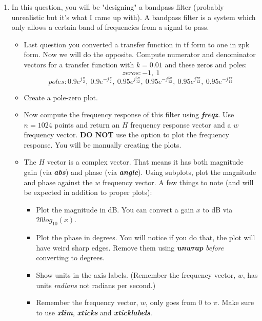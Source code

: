 \documentclass[12pt]{article}
\begin{document}
\begin{enumerate}
\begin{itemize}
	\end{itemize}
\item In this question, you will be "designing" a bandpass filter (probably unrealistic but it's what I came up with). A bandpass filter is a system which only allows a certain band of frequencies from a signal to pass.
\begin{itemize}
	\item Last question you converted a transfer function in tf form to one in zpk form. Now we will do the opposite. Compute numerator and denominator vectors for a transfer function with $k = 0.01$ and these zeros and poles:
	$$zeros: -1,\: 1$$
	$$poles: 0.9e^{j\frac{\pi}{2}},\: 0.9e^{-j\frac{\pi}{2}},\: 0.95e^{j\frac{5\pi}{12}},\: 0.95e^{-j\frac{5\pi}{12}},\: 0.95e^{j\frac{7\pi}{12}},\: 0.95e^{-j\frac{7\pi}{12}}$$
	\item Create a pole-zero plot.
	\item Now compute the frequency response of this filter using \textbf{\textit{freqz}}. Use $n = 1024$ points and return an $H$ frequency response vector and a $w$ frequency vector. \textbf{DO NOT} use the option to plot the frequency response. You will be manually creating the plots.
	\item The $H$ vector is a complex vector. That means it has both magnitude gain (via \textbf{\textit{abs}}) and phase (via \textbf{\textit{angle}}). Using subplots, plot the magnitude and phase against the $w$ frequency vector. A few things to note (and will be expected in addition to proper plots):
	\begin{itemize}
	\item Plot the magnitude in dB. You can convert a gain $x$ to dB via $20log_{10}(x)$.
	\item Plot the phase in degrees. You will notice if you do that, the plot will have weird sharp edges. Remove them using \textbf{\textit{unwrap}} \textit{before} converting to degrees.
	\item Show units in the axis labels. (Remember the frequency vector, $w$, has units \textit{radians} not radians per second.)
	\item Remember the frequency vector, $w$, only goes from 0 to $\pi$. Make sure to use \textbf{\textit{xlim}}, \textbf{\textit{xticks}} and \textbf{\textit{xticklabels}}.
	\end{itemize}
\end{itemize}
\end{enumerate}
\end{document}
